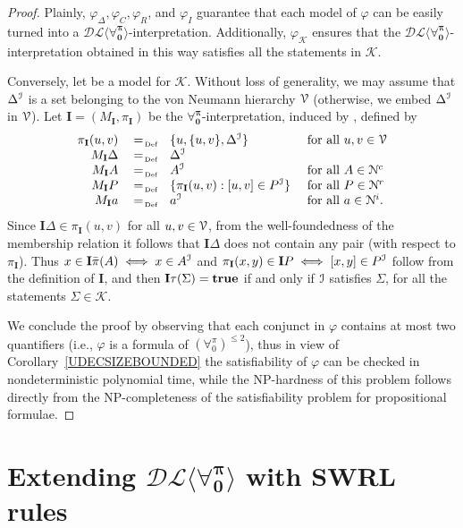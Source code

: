 \documentclass[a4paper,UKenglish]{lipics}
\newcommand{\Lang}{\ensuremath{\mathbf{\forall_{0}^{\pi}}}\xspace}
\newcommand{\LangBounded}[1]{\ensuremath{(\forall_{0}^{\pi})^{\leq #1}}\xspace}
\newcommand{\nonpairs}[1]{\bar{\pi}(#1)}
\newcommand{\assignment}[1]{\ensuremath{M_{#1}}}
\newcommand{\pairf}[1]{\ensuremath{\pi_{#1}}}
\newcommand{\inter}{\ensuremath{\mathbf{I}}\xspace}
\newcommand{\dlLang}{\ensuremath{\mathcal{DL\langle}\Lang\mathcal{\rangle}}\xspace}
\begin{document}
\begin{proof}
Plainly, $\varphi_{\Delta}, \varphi_{C}, \varphi_{R}$, and $\varphi_{I}$
guarantee that each model of $\varphi$ can be easily turned into a
\dlLang-interpretation. Additionally, $\varphi_{\mathcal{K}}$ ensures
that the  \dlLang-interpretation obtained in this way satisfies all
the statements in $\mathcal{K}$.

Conversely, let \I be a model for $\mathcal{K}$. Without loss of
generality, we may assume that $\Delta^{\mathcal{I}}$ is a set belonging to
the von Neumann hierarchy $\mathcal{V}$ (otherwise, we embed $\Delta^{\mathcal{I}}$ in
 $\mathcal{V}$). Let $\inter=(\assignment{\inter}, \pairf{\inter})$ be the \Lang-interpretation,
induced by \I, defined by
\[
\begin{array}{rcll}
 \pairf{\inter}(u,v) & \defAs & \{u, \{u,v\}, \Delta^{\I}\} & \mbox{ for all }u,v \in \VNU\\
 \assignment{\inter} \Delta & \defAs & \Delta^{\I}&\\
 \assignment{\inter} A & \defAs & A^{\I} & \mbox{ for all }A \in \mathcal{N}^c\\
 \assignment{\inter} P & \defAs &\{ \pairf{\inter}(u,v) : [u,v] \in P^{\I}\} & \mbox{ for all }P \in \mathcal{N}^r\\
 \assignment{\inter} a & \defAs & a^{\I} & \mbox{ for all }a \in \mathcal{N}^i.
\end{array}
\]
Since $\inter \Delta \in \pairf{\inter}(u,v)$ for all $u,v \in \mathcal{V}$,
from the well-foundedness of the membership relation it follows that
$\inter \Delta$ does not contain any pair (with respect to
$\pairf{\inter}$).  Thus $x \in \inter \nonpairs{A} \iff x \in A^{\I}$
and $\pairf{\inter}(x,y) \in \inter P \iff [x,y] \in P^{\I}$ follow
from the definition of $\inter$, and then $\inter \tau(\Sigma) =
\true$ if and only if $\mathcal{I}$ satisfies $\Sigma$, for all the statements
$\Sigma \in \mathcal{K}$.

We conclude the proof by observing that each conjunct in $\varphi$
contains at most two quantifiers (i.e., $\varphi$ is a formula of
\LangBounded{2}), thus in view of Corollary~\ref{UDECSIZEBOUNDED} the
satisfiability of $\varphi$ can be checked in nondeterministic
polynomial time, while the \textsc{NP}-hardness of this problem
follows directly from the \textsc{NP}-completeness of the
satisfiability problem for propositional formulae.
\end{proof}

\section{Extending \dlLang with \textsf{SWRL} rules}\label{SWRL}
\end{document}
